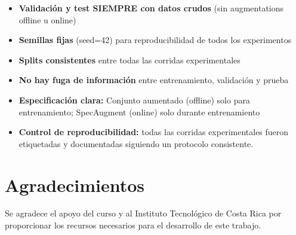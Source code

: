 \documentclass[conference]{IEEEtran}
\begin{document}
\begin{itemize}
    \item \textbf{Validación y test SIEMPRE con datos crudos} (sin augmentations offline u online)
    \item \textbf{Semillas fijas} (seed=42) para reproducibilidad de todos los experimentos
    \item \textbf{Splits consistentes} entre todas las corridas experimentales
    \item \textbf{No hay fuga de información} entre entrenamiento, validación y prueba
    \item \textbf{Especificación clara:} Conjunto aumentado (offline) solo para entrenamiento; SpecAugment (online) solo durante entrenamiento
    \item \textbf{Control de reproducibilidad:} todas las corridas experimentales fueron etiquetadas y documentadas siguiendo un protocolo consistente.
\end{itemize}

\section*{Agradecimientos}
Se agradece el apoyo del curso y al Instituto Tecnológico de Costa Rica por proporcionar los recursos necesarios para el desarrollo de este trabajo.
\end{document}
